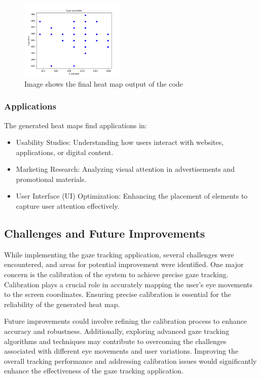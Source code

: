 \documentclass[letterpaper, 10 pt, conference]{ieeeconf}  %
\begin{document}
\begin{figure}
  \centering
  \includegraphics[width=0.45\textwidth]{heat2.png} %
  \caption{Image shows the final heat map output of the code }
  \label{fig:your_label}
\end{figure}

\subsubsection{Applications}

The generated heat maps find applications in:
\begin{itemize}
    \item Usability Studies: Understanding how users interact with websites, applications, or digital content.
    \item Marketing Research: Analyzing visual attention in advertisements and promotional materials.
    \item User Interface (UI) Optimization: Enhancing the placement of elements to capture user attention effectively.
\end{itemize}
\subsection{Challenges and Future Improvements}

While implementing the gaze tracking application, several challenges were encountered, and areas for potential improvement were identified. One major concern is the calibration of the system to achieve precise gaze tracking. Calibration plays a crucial role in accurately mapping the user's eye movements to the screen coordinates. Ensuring precise calibration is essential for the reliability of the generated heat map.

Future improvements could involve refining the calibration process to enhance accuracy and robustness. Additionally, exploring advanced gaze tracking algorithms and techniques may contribute to overcoming the challenges associated with different eye movements and user variations. Improving the overall tracking performance and addressing calibration issues would significantly enhance the effectiveness of the gaze tracking application.
\end{document}
